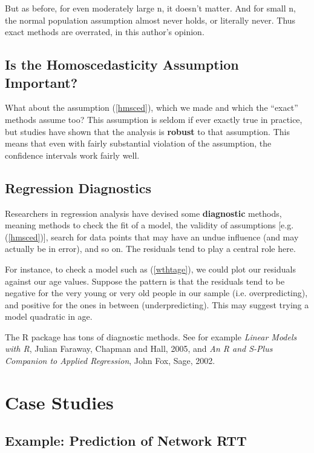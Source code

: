 But as before, for even moderately large n, it doesn't matter.  And for
small n, the normal population assumption almost never holds, or
literally never.  Thus exact methods are overrated, in this author's
opinion.

\subsection{Is the Homoscedasticity Assumption Important?}

What about the assumption (\ref{hmsced}), which we made and which the
``exact'' methods assume too?  This assumption is seldom if ever exactly
true in practice, but studies have shown that the analysis is {\bf
robust} to that assumption.  This means that even with fairly substantial
violation of the assumption, the confidence intervals work fairly well.

\subsection{Regression Diagnostics}
\label{diags}

Researchers in regression analysis have devised some {\bf diagnostic} 
methods, meaning methods to check the fit of a model, the validity of
assumptions [e.g. (\ref{hmsced})], search for data points that may have
an undue influence (and may actually be in error), and so on.  The
residuals tend to play a central role here.

For instance, to check a model such as (\ref{wthtage}), we could plot
our residuals against our age values.  Suppose the pattern is that the
residuals tend to be negative for the very young or very old people in
our sample (i.e. overpredicting), and positive for the ones in between
(underpredicting).  This may suggest trying a model quadratic in age.

The R package has tons of diagnostic methods.  See for example 
{\it Linear Models with R}, Julian Faraway, Chapman and Hall, 2005, and
{\it An R and S-Plus Companion to Applied Regression}, John Fox, Sage,
2002.

\section{Case Studies}

\subsection{Example:  Prediction of Network RTT}

